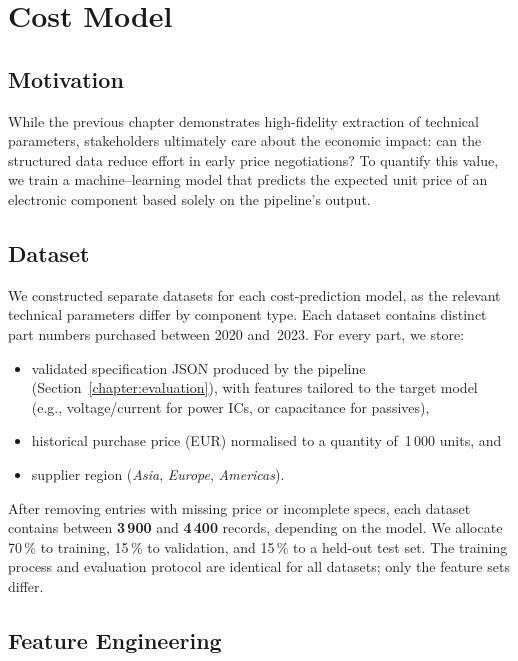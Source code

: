 \section{Cost Model}
\label{chapter:costmodel}

\subsection{Motivation}
While the previous chapter demonstrates high-fidelity extraction of technical parameters, stakeholders ultimately care about the economic impact: can the structured data reduce effort in early price negotiations?  To quantify this value, we train a machine–learning model that predicts the expected unit price of an electronic component based solely on the pipeline's output.

\subsection{Dataset}
We constructed separate datasets for each cost-prediction model, as the relevant technical parameters differ by component type. Each dataset contains distinct part numbers purchased between 2020 and~2023. For every part, we store:
\begin{itemize}
  \item validated specification JSON produced by the pipeline (Section~\ref{chapter:evaluation}), with features tailored to the target model (e.g., voltage/current for power ICs, or capacitance for passives),
  \item historical purchase price (EUR) normalised to a quantity of~1\,000 units, and
  \item supplier region (\textit{Asia}, \textit{Europe}, \textit{Americas}).
\end{itemize}
After removing entries with missing price or incomplete specs, each dataset contains between \textbf{3\,900} and \textbf{4\,400} records, depending on the model. We allocate 70\,\% to training, 15\,\% to validation, and 15\,\% to a held-out test set. The training process and evaluation protocol are identical for all datasets; only the feature sets differ.

\subsection{Feature Engineering}
